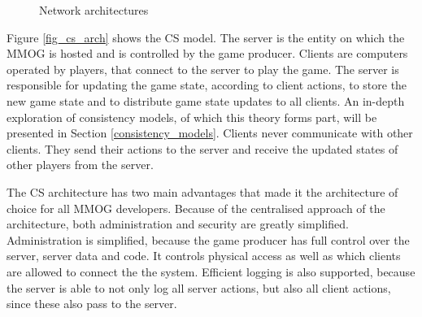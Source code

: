 \documentclass[journal,oneside,a4paper,onecolumn]{IEEEtran}
\begin{document}
\begin{figure}[htbp]
\centering
\caption{Network architectures}
\end{figure}
%
Figure \ref{fig_cs_arch} shows the \ac{CS} model. The server is the entity on which the MMOG is hosted and is controlled by the game producer. Clients are computers operated by players, that connect to the server to play the game. The server is responsible for updating the game state, according to client actions, to store the new game state and to distribute game state updates to all clients. An in-depth exploration of consistency models, of which this theory forms part, will be presented in Section \ref{consistency_models}. Clients never communicate with other clients. They send their actions to the server and receive the updated states of other players from the server.

The \ac{CS} architecture has two main advantages that made it the architecture of choice for all MMOG developers. Because of the centralised approach of the architecture, both administration and security are greatly simplified. Administration is simplified, because the game producer has full control over the server, server data and code. It controls physical access as well as which clients are allowed to connect the the system. Efficient logging is also supported, because the server is able to not only log all server actions, but also all client actions, since these also pass to the server.
\end{document}
